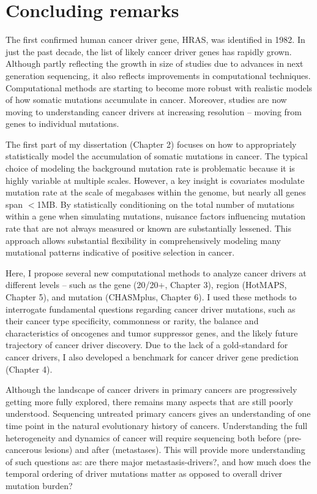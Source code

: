 
\chapter{Concluding remarks}
\label{chap:ch8}

The first confirmed human cancer driver gene, HRAS, was identified in 1982. In just the past decade, the list of likely cancer driver genes has rapidly grown. Although partly reflecting the growth in size of studies due to advances in next generation sequencing, it also reflects improvements in computational techniques. Computational methods are starting to become more robust with realistic models of how somatic mutations accumulate in cancer. Moreover, studies are now moving to understanding cancer drivers at increasing resolution -- moving from genes to individual mutations.

The first part of my dissertation (Chapter 2) focuses on how to appropriately statistically model the accumulation of somatic mutations in cancer. The typical choice of modeling the background mutation rate is problematic because it is highly variable at multiple scales. However, a key insight is covariates modulate mutation rate at the scale of megabases within the genome, but nearly all genes span $<$1MB. By statistically conditioning on the total number of mutations within a gene when simulating mutations, nuisance factors influencing mutation rate that are not always measured or known are substantially lessened. This approach allows substantial flexibility in comprehensively modeling many mutational patterns indicative of positive selection in cancer.

Here, I propose several new computational methods to analyze cancer drivers at different levels -- such as the gene (20/20+, Chapter 3), region (HotMAPS, Chapter 5), and mutation (CHASMplus, Chapter 6). I used these methods to interrogate fundamental questions regarding cancer driver mutations, such as their cancer type specificity, commonness or rarity, the balance and characteristics of oncogenes and tumor suppressor genes, and the likely future trajectory of cancer driver discovery. Due to the lack of a gold-standard for cancer drivers, I also developed a benchmark for cancer driver gene prediction (Chapter 4).




Although the landscape of cancer drivers in primary cancers are progressively getting more fully explored, there remains many aspects that are still poorly understood. Sequencing untreated primary cancers gives an understanding of one time point in the natural evolutionary history of cancers. Understanding the full heterogeneity and dynamics of cancer will require sequencing both before (pre-cancerous lesions) and after (metastases). This will provide more understanding of such questions as: are there major metastasis-drivers?, and how much does the temporal ordering of driver mutations matter as opposed to overall driver mutation burden?

